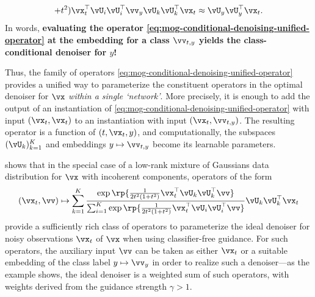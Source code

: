 \documentclass[../../book-main.tex]{subfiles}
\begin{document}
\begin{example}
\begin{equation}
{{{            + t^{2})}\vx_t^\top \vU_i \vU_i^\top \vv_y}
        }
        \vU_{k}\vU_{k}^{\top}\vx_t
        \approx
        \vU_{y}\vU_{y}^{\top}\vx_t.
    \end{equation}
    In words, \textbf{evaluating the operator
        \eqref{eq:mog-conditional-denoising-unified-operator} at the
        embedding for
    a class $\vv_{t, y}$ yields the class-conditional denoiser for $y$!}

    Thus, the family of operators
    \eqref{eq:mog-conditional-denoising-unified-operator}
    provides a unified way to parameterize the constituent
    operators in the optimal denoiser for $\vx$ \textit{within a single
    `network'}.
    More precisely, it is enough to add the output of an instantiation of
    \eqref{eq:mog-conditional-denoising-unified-operator} with input $(\vx_t,
    \vx_t)$ to an instantiation with input $(\vx_t, \vv_{t, y})$.
    The resulting
    operator is a function of $(t, \vx_t, y)$, and computationally,
    the subspaces
    $(\vU_k)_{k=1}^K$ and embeddings $y \mapsto \vv_{t, y}$ become its learnable
    parameters.
\end{example}

 shows
that in the special case of
a low-rank mixture of Gaussians data distribution for $\vx$ with incoherent
components, operators of the form
\begin{equation}\label{eq:operator-for-parameterizing-cfg-denoiser-mog}
    (\vx_t, \vv) \mapsto
    \sum_{k = 1}^{K}\frac{
        \exp\rp{\frac{1}{2t^{2}(1
        + t^{2})}\vx_t^\top \vU_k \vU_k^\top \vv}
    }
    {
        \sum_{i
        = 1}^{K}\exp\rp{\frac{1}{2t^{2}(1
        + t^{2})}\vx_t^\top \vU_i \vU_i^\top \vv}
    }
    \vU_{k}\vU_{k}^{\top}\vx_t
\end{equation}
provide a sufficiently rich class of operators to parameterize the ideal
denoiser for noisy observations $\vx_t$ of $\vx$ when using
classifier-free guidance.
For such operators,
the auxiliary input $\vv$ can be taken as either $\vx_t$ or a suitable embedding
of the class label $y \mapsto \vv_y$ in order to realize such a denoiser---as
the example shows, the ideal denoiser is a weighted sum of such operators, with
weights derived from the guidance strength $\gamma>1$.
\end{document}
